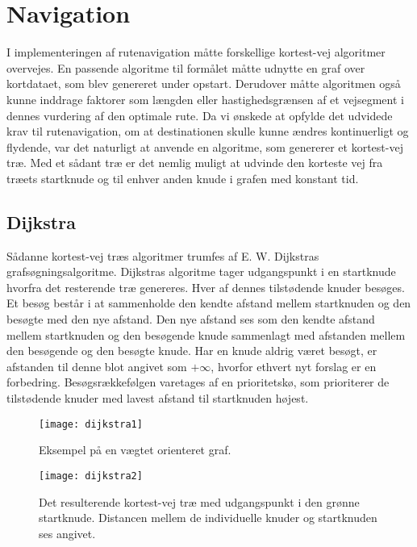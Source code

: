 \section{Navigation}
\label{sec:navigation}
I implementeringen af rutenavigation måtte forskellige kortest-vej algoritmer overvejes. En passende algoritme til formålet måtte udnytte en graf over kortdataet, som blev genereret under opstart. Derudover måtte algoritmen også kunne inddrage faktorer som længden eller hastighedsgrænsen af et vejsegment i dennes vurdering af den optimale rute. Da vi ønskede at opfylde det udvidede krav til rutenavigation, om at destinationen skulle kunne ændres kontinuerligt og flydende, var det naturligt at anvende en algoritme, som genererer et kortest-vej træ. Med et sådant træ er det nemlig muligt at udvinde den korteste vej fra træets startknude og til enhver anden knude i grafen med konstant tid.

\subsection{Dijkstra}
\label{subsec:dijkstra}
Sådanne kortest-vej træs algoritmer trumfes af E. W. Dijkstras grafsøgningsalgoritme. Dijkstras algoritme tager udgangspunkt i en startknude hvorfra det resterende træ genereres. Hver af dennes tilstødende knuder besøges. Et besøg består i at sammenholde den kendte afstand mellem startknuden og den besøgte med den nye afstand. Den nye afstand ses som den kendte afstand mellem startknuden og den besøgende knude sammenlagt med afstanden mellem den besøgende og den besøgte knude. Har en knude aldrig været besøgt, er afstanden til denne blot angivet som $+\infty$, hvorfor ethvert nyt forslag er en forbedring. Besøgsrækkefølgen varetages af en prioritetskø, som prioriterer de tilstødende knuder med lavest afstand til startknuden højest.

\begin{figure}[h]
	\centering
  \texttt{[image: dijkstra1]}
  \captionsetup{width=0.8\textwidth}
  \caption{Eksempel på en vægtet orienteret graf.}
\end{figure}

\begin{figure}[h]
	\centering
  \texttt{[image: dijkstra2]}
  \captionsetup{width=0.8\textwidth}
  \caption{Det resulterende kortest-vej træ med udgangspunkt i den grønne startknude. Distancen mellem de individuelle knuder og startknuden ses angivet.}
\end{figure}


